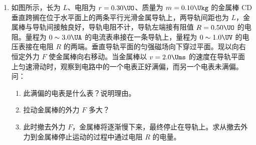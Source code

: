 \documentclass[\gkver]{gaokaozhenti}
\begin{document}
\begin{enumerate}
{\begin{enumerate}
	\item
	$T_{2} = \frac{\left(p_{0} + \frac{mg}{S} + 2\rho gh\right)(L + h)}{p_{0}L}T_{0}$

\end{enumerate}
}

\item
如图所示，长为 $L$、电阻为 $r = 0.30\UO$、质量为 $m = 0.10\Ukg$ 的金属棒 CD 垂直跨搁在位于水平面上的两条平行光滑金属导轨上，两导轨间距也为 $L$，金属棒与导轨间接触良好，导轨电阻不计，导轨左端接有阻值 $R = 0.50\UO$ 的电阻。量程为 $0\sim3.0\UA$ 的电流表串接在一条导轨上，量程为 $0\sim1.0\UV$ 的电压表接在电阻 $R$ 的两端。垂直导轨平面的匀强磁场向下穿过平面。现以向右恒定外力 $F$ 使金属棒向右移动。当金属棒以 $v = 2.0\Ums$ 的速度在导轨平面上匀速滑动时，观察到电路中的一个电表正好满偏，而另一个电表未满偏。问：
\begin{enumerate}
	\item
	此满偏的电表是什么表？说明理由。
	\item
	拉动金属棒的外力 $F$ 多大？
	\item
	此时撤去外力 $F$，金属棒将逐渐慢下来，最终停止在导轨上。求从撤去外力到金属棒停止运动的过程中通过电阻 $R$ 的电量。
\end{enumerate}
\onepicture[align=right, w=5.74cm]{}
\end{enumerate}
\end{document}
